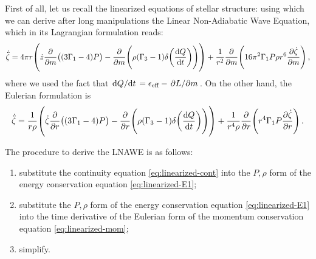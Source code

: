 \documentclass[main.tex]{subfiles}
\begin{document}
First of all, let us recall the linearized equations of stellar structure: 
%
%
using which we can derive after long manipulations the Linear Non-Adiabatic Wave Equation, which in its Lagrangian formulation reads: 
%
\begin{align}
\dot{\ddot{\zeta}}
=
4 \pi r \qty(\dot{z} \pdv{}{m} \qty((3 \Gamma_1 - 4)P) 
-  \pdv{}{m} \qty(\rho (\Gamma_3 - 1) \delta \qty(\dv{Q}{t})))
+ \frac{1}{r^2} \pdv{}{m} \qty(16 \pi^2 \Gamma_1 P \rho r^{6} \pdv{\dot{\zeta}}{m})
\,,
\end{align}
%
where we used the fact that \(\dv*{Q}{t} = \epsilon _{\text{eff}} - \pdv*{L}{m}\). On the other hand, the Eulerian formulation is 
%
\begin{align}
\dot{\ddot{\zeta}} = \frac{1}{r \rho } \qty(\dot{\zeta}\pdv{}{r} \qty((3\Gamma_1 -4) P ) - \pdv{}{r} \qty(\rho (\Gamma_3 -1) \delta \qty(\dv{Q}{t})))
+ \frac{1}{r^4 \rho}\pdv{}{r}\qty(r^{4} \Gamma_1 P \pdv{\dot{\zeta}}{r}) 
\,.
\end{align}

\begin{bluebox}
The procedure to derive the LNAWE is as follows: 
\begin{enumerate}
  \item substitute the continuity equation \eqref{eq:linearized-cont} into the \(P, \rho \) form of the energy conservation equation \eqref{eq:linearized-E1}; 
  \item substitute the \(P, \rho \) form of the energy conservation equation \eqref{eq:linearized-E1} into the time derivative of the Eulerian form of the momentum conservation equation \eqref{eq:linearized-mom};
  \item simplify.
\end{enumerate}
\end{bluebox}
\end{document}
